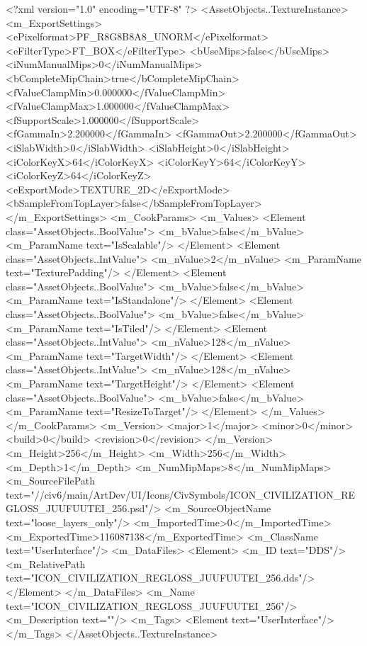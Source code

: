 <?xml version="1.0" encoding="UTF-8" ?>
<AssetObjects..TextureInstance>
	<m_ExportSettings>
		<ePixelformat>PF_R8G8B8A8_UNORM</ePixelformat>
		<eFilterType>FT_BOX</eFilterType>
		<bUseMips>false</bUseMips>
		<iNumManualMips>0</iNumManualMips>
		<bCompleteMipChain>true</bCompleteMipChain>
		<fValueClampMin>0.000000</fValueClampMin>
		<fValueClampMax>1.000000</fValueClampMax>
		<fSupportScale>1.000000</fSupportScale>
		<fGammaIn>2.200000</fGammaIn>
		<fGammaOut>2.200000</fGammaOut>
		<iSlabWidth>0</iSlabWidth>
		<iSlabHeight>0</iSlabHeight>
		<iColorKeyX>64</iColorKeyX>
		<iColorKeyY>64</iColorKeyY>
		<iColorKeyZ>64</iColorKeyZ>
		<eExportMode>TEXTURE_2D</eExportMode>
		<bSampleFromTopLayer>false</bSampleFromTopLayer>
	</m_ExportSettings>
	<m_CookParams>
		<m_Values>
			<Element class="AssetObjects..BoolValue">
				<m_bValue>false</m_bValue>
				<m_ParamName text="IsScalable"/>
			</Element>
			<Element class="AssetObjects..IntValue">
				<m_nValue>2</m_nValue>
				<m_ParamName text="TexturePadding"/>
			</Element>
			<Element class="AssetObjects..BoolValue">
				<m_bValue>false</m_bValue>
				<m_ParamName text="IsStandalone"/>
			</Element>
			<Element class="AssetObjects..BoolValue">
				<m_bValue>false</m_bValue>
				<m_ParamName text="IsTiled"/>
			</Element>
			<Element class="AssetObjects..IntValue">
				<m_nValue>128</m_nValue>
				<m_ParamName text="TargetWidth"/>
			</Element>
			<Element class="AssetObjects..IntValue">
				<m_nValue>128</m_nValue>
				<m_ParamName text="TargetHeight"/>
			</Element>
			<Element class="AssetObjects..BoolValue">
				<m_bValue>false</m_bValue>
				<m_ParamName text="ResizeToTarget"/>
			</Element>
		</m_Values>
	</m_CookParams>
	<m_Version>
		<major>1</major>
		<minor>0</minor>
		<build>0</build>
		<revision>0</revision>
	</m_Version>
	<m_Height>256</m_Height>
	<m_Width>256</m_Width>
	<m_Depth>1</m_Depth>
	<m_NumMipMaps>8</m_NumMipMaps>
	<m_SourceFilePath text="//civ6/main/ArtDev/UI/Icons/CivSymbols/ICON_CIVILIZATION_REGLOSS_JUUFUUTEI_256.psd"/>
	<m_SourceObjectName text="loose_layers_only"/>
	<m_ImportedTime>0</m_ImportedTime>
	<m_ExportedTime>116087138</m_ExportedTime>
	<m_ClassName text="UserInterface"/>
	<m_DataFiles>
		<Element>
			<m_ID text="DDS"/>
			<m_RelativePath text="ICON_CIVILIZATION_REGLOSS_JUUFUUTEI_256.dds"/>
		</Element>
	</m_DataFiles>
	<m_Name text="ICON_CIVILIZATION_REGLOSS_JUUFUUTEI_256"/>
	<m_Description text=""/>
	<m_Tags>
		<Element text="UserInterface"/>
	</m_Tags>
</AssetObjects..TextureInstance>

